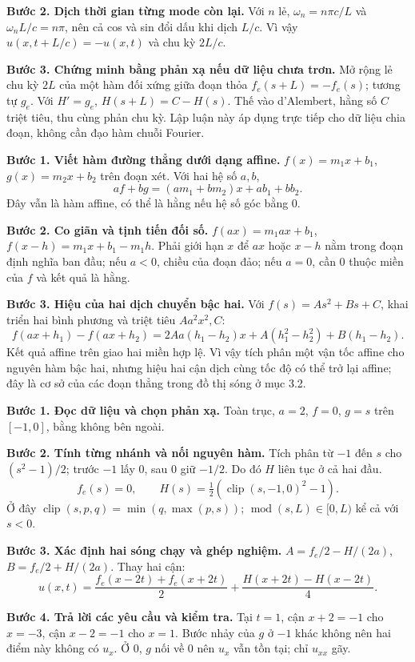 \textbf{Bước 2. Dịch thời gian từng mode còn lại.} Với $n$ lẻ, $\omega_n=n\pi c/L$ và $\omega_nL/c=n\pi$, nên cả cos và sin đổi dấu khi dịch $L/c$. Vì vậy $u(x,t+L/c)=-u(x,t)$ và chu kỳ $2L/c$.

\textbf{Bước 3. Chứng minh bằng phản xạ nếu dữ liệu chưa trơn.} Mở rộng lẻ chu kỳ $2L$ của một hàm đối xứng giữa đoạn thỏa $f_e(s+L)=-f_e(s)$; tương tự $g_e$. Với $H'=g_e$, $H(s+L)=C-H(s)$. Thế vào d'Alembert, hằng số $C$ triệt tiêu, thu cùng phản chu kỳ. Lập luận này áp dụng trực tiếp cho dữ liệu chia đoạn, không cần đạo hàm chuỗi Fourier.

\textbf{Bước 1. Viết hàm đường thẳng dưới dạng affine.} $f(x)=m_1x+b_1$, $g(x)=m_2x+b_2$ trên đoạn xét. Với hai hệ số $a,b$,
\[af+bg=(am_1+bm_2)x+ab_1+bb_2.\]
Đây vẫn là hàm affine, có thể là hằng nếu hệ số góc bằng $0$.

\textbf{Bước 2. Co giãn và tịnh tiến đối số.} $f(ax)=m_1ax+b_1$, $f(x-h)=m_1x+b_1-m_1h$. Phải giới hạn $x$ để $ax$ hoặc $x-h$ nằm trong đoạn định nghĩa ban đầu; nếu $a<0$, chiều của đoạn đảo; nếu $a=0$, cần $0$ thuộc miền của $f$ và kết quả là hằng.

\textbf{Bước 3. Hiệu của hai dịch chuyển bậc hai.} Với $f(s)=As^2+Bs+C$, khai triển hai bình phương và triệt tiêu $Aa^2x^2,C$:
\[f(ax+h_1)-f(ax+h_2)=2Aa(h_1-h_2)x+A(h_1^2-h_2^2)+B(h_1-h_2).\]
Kết quả affine trên giao hai miền hợp lệ. Vì vậy tích phân một vận tốc affine cho nguyên hàm bậc hai, nhưng hiệu hai cận dịch cùng tốc độ có thể trở lại affine; đây là cơ sở của các đoạn thẳng trong đồ thị sóng ở mục 3.2.

\textbf{Bước 1. Đọc dữ liệu và chọn phản xạ.} Toàn trục, $a=2$, $f=0$, $g=s$ trên $[-1,0]$, bằng không bên ngoài.

\textbf{Bước 2. Tính từng nhánh và nối nguyên hàm.} Tích phân từ $-1$ đến $s$ cho $(s^2-1)/2$; trước $-1$ lấy $0$, sau $0$ giữ $-1/2$. Do đó $H$ liên tục ở cả hai đầu.
\[f_e(s)=0,\qquad H(s)=\tfrac12(\operatorname{clip}(s,-1,0)^2-1).\]
Ở đây $\operatorname{clip}(s,p,q)=\min(q,\max(p,s))$; $\operatorname{mod}(s,L)\in[0,L)$ kể cả với $s<0$.

\textbf{Bước 3. Xác định hai sóng chạy và ghép nghiệm.} $A=f_e/2-H/(2a)$, $B=f_e/2+H/(2a)$. Thay hai cận:
\[u(x,t)=\frac{f_e(x-2t)+f_e(x+2t)}2+\frac{H(x+2t)-H(x-2t)}{4}.\]

\textbf{Bước 4. Trả lời các yêu cầu và kiểm tra.} Tại $t=1$, cận $x+2=-1$ cho $x=-3$, cận $x-2=-1$ cho $x=1$. Bước nhảy của $g$ ở $-1$ khác không nên hai điểm này không có $u_x$. Ở $0$, $g$ nối về $0$ nên $u_x$ vẫn tồn tại; chỉ $u_{xx}$ gãy.

